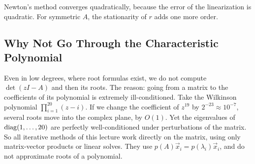 Newton's method converges quadratically, because the error of the linearization is quadratic. For symmetric $A$, the stationarity of $r$ adds one more order.


\subsection{Why Not Go Through the Characteristic Polynomial}

Even in low degrees, where root formulas exist, we do not compute $\det(zI - A)$ and then its roots. The reason: going from a matrix to the coefficients of its polynomial is extremely ill-conditioned. Take the Wilkinson polynomial $\prod_{i=1}^{20}(z - i)$. If we change the coefficient of $z^{19}$ by $2^{-23} \approx 10^{-7}$, several roots move into the complex plane, by $O(1)$. Yet the eigenvalues of $\operatorname{diag}(1, \dots, 20)$ are perfectly well-conditioned under perturbations of the matrix. So all iterative methods of this lecture work directly on the matrix, using only matrix-vector products or linear solves. They use $p(A)\vec{x}_i = p(\lambda_i)\vec{x}_i$, and do not approximate roots of a polynomial.
